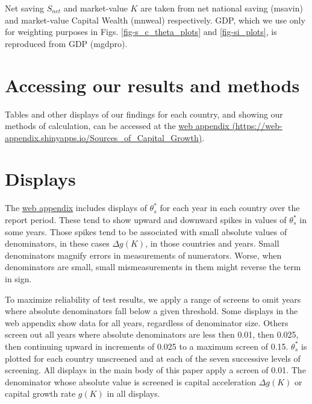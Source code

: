 \documentclass[a4paper,fleqn]{latex_styles/cas-sc}
\begin{document}
Net saving $S_{net}$ and market-value $K$ are taken from net national saving (msavin) and market-value Capital Wealth (mnweal) respectively. GDP, which we use only for weighting purposes in Figs. \ref{fig-s_c_theta_plots} and \ref{fig-si_plots}, is reproduced from GDP (mgdpro).

\hypertarget{accessing-our-results-and-methods}{%
\section{Accessing our results and
methods}\label{accessing-our-results-and-methods}}

Tables and other displays of our findings for each country, and showing
our methods of calculation, can be accessed at the
\href{https://web-appendix.shinyapps.io/Sources\_of\_Capital\_Growth/}{web appendix (https://web-appendix.shinyapps.io/Sources\_of\_Capital\_Growth)}.

\hypertarget{sec-displays}{%
\section{Displays}\label{sec-displays}}

The \href{https://web-appendix.shinyapps.io/Sources\_of\_Capital\_Growth/}{web
appendix} includes displays of \(\theta_s^*\) for
each year in each country over the report period. These tend to show
upward and downward spikes in values of \(\theta_s^*\)
in some years. Those spikes tend to be associated with small absolute
values of denominators, in these cases \(\Delta g(K)\), in those
countries and years. Small denominators magnify errors in measurements
of numerators. Worse, when denominators are small, small mismeasurements in them might reverse the term in sign.

To maximize reliability of test results, we apply a range of screens to
omit years where absolute denominators fall below a given
threshold. Some displays in the web appendix show data for all years, regardless of denominator size.
Others screen out all years where
absolute denominators are less then 0.01, then 0.025, then continuing upward in
increments of 0.025 to a maximum screen of 0.15. \(\theta_s^*\)
is plotted for each country unscreened and at each of the
seven successive levels of screening. All displays in the main body of this paper apply a screen of 0.01. 
The denominator whose absolute value is screened is capital acceleration
$\Delta g(K)$ or capital growth rate \(g(K)\) in all displays. 
\end{document}
